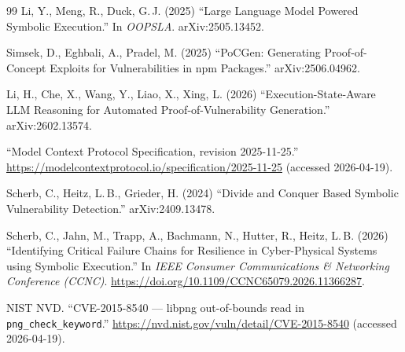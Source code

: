 \documentclass[3p,times,procedia]{elsarticle}
\begin{document}
\begin{thebibliography}{99}
 Li, Y., Meng, R., Duck, G.\,J. (2025) ``Large Language Model Powered Symbolic Execution.'' In \emph{OOPSLA}. arXiv:2505.13452.

 Simsek, D., Eghbali, A., Pradel, M. (2025) ``PoCGen: Generating Proof-of-Concept Exploits for Vulnerabilities in npm Packages.'' arXiv:2506.04962.

 Li, H., Che, X., Wang, Y., Liao, X., Xing, L. (2026) ``Execution-State-Aware LLM Reasoning for Automated Proof-of-Vulnerability Generation.'' arXiv:2602.13574.

 ``Model Context Protocol Specification, revision 2025-11-25.'' \url{https://modelcontextprotocol.io/specification/2025-11-25} (accessed 2026-04-19).

 Scherb, C., Heitz, L.\,B., Grieder, H. (2024) ``Divide and Conquer Based Symbolic Vulnerability Detection.'' arXiv:2409.13478.

 Scherb, C., Jahn, M., Trapp, A., Bachmann, N., Hutter, R., Heitz, L.\,B. (2026) ``Identifying Critical Failure Chains for Resilience in Cyber-Physical Systems using Symbolic Execution.'' In \emph{IEEE Consumer Communications \& Networking Conference (CCNC)}. \url{https://doi.org/10.1109/CCNC65079.2026.11366287}.

 NIST NVD. ``CVE-2015-8540 --- libpng out-of-bounds read in \texttt{png\_check\_keyword}.'' \url{https://nvd.nist.gov/vuln/detail/CVE-2015-8540} (accessed 2026-04-19).

\end{thebibliography}
\end{document}
